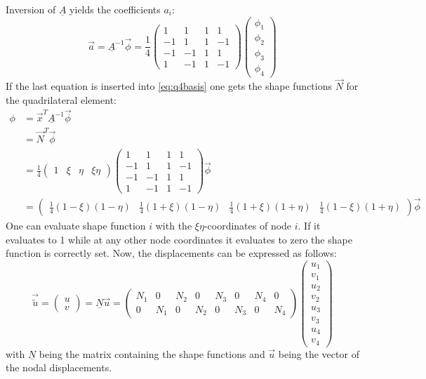  Inversion of $\underline{A}$ yields the coefficients $a_i$:
  \begin{equation}
  \vec{a} = \underline{A}^{-1}\vec{\phi} = \frac{1}{4} \begin{pmatrix}
  1&1&1&1\\
  -1&1&1&-1\\
  -1&-1&1&1\\
  1&-1&1&-1
  \end{pmatrix} \begin{pmatrix}
  \phi_1\\\phi_2\\\phi_3\\\phi_4
  \end{pmatrix}
  \end{equation}
  If the last equation is inserted into \eqref{eq:q4basis} one gets the shape functions $\vec{N}$ for the quadrilateral element:
  \begin{align}
  \phi &= \vec{x}^T\underline{A}^{-1}\vec{\phi} \nonumber\\
    &= \vec{N}^T\vec{\phi} \nonumber\\
    &= \frac{1}{4} \begin{pmatrix}
    1&\xi&\eta&\xi\eta
    \end{pmatrix} \begin{pmatrix}
    1&1&1&1\\
    -1&1&1&-1\\
    -1&-1&1&1\\
    1&-1&1&-1
    \end{pmatrix} \vec{\phi} \nonumber\\
    &= \begin{pmatrix}
    \frac{1}{4}(1-\xi)(1-\eta)&\frac{1}{4}(1+\xi)(1-\eta)&\frac{1}{4}(1+\xi)(1+\eta)&\frac{1}{4}(1-\xi)(1+\eta)
    \end{pmatrix} \vec{\phi}
  \end{align}
  One can evaluate shape function $i$ with the $\xi\eta$-coordinates of node $i$. If it evaluates to 1 while at any other node coordinates it evaluates to zero the shape function is correctly set. Now, the displacements can be expressed as follows:
  \begin{equation}
  \vec{\tilde{u}} = \begin{pmatrix}
  u\\v
  \end{pmatrix} = \underline{N}\vec{u} = \begin{pmatrix}
  N_1&0&N_2&0&N_3&0&N_4&0\\
  0&N_1&0&N_2&0&N_3&0&N_4
  \end{pmatrix} \begin{pmatrix}
  u_1\\v_1\\u_2\\v_2\\u_3\\v_3\\u_4\\v_4
  \end{pmatrix}
  \end{equation}
  with $\underline{N}$ being the matrix containing the shape functions and $\vec{u}$ being the vector of the nodal displacements.
  

